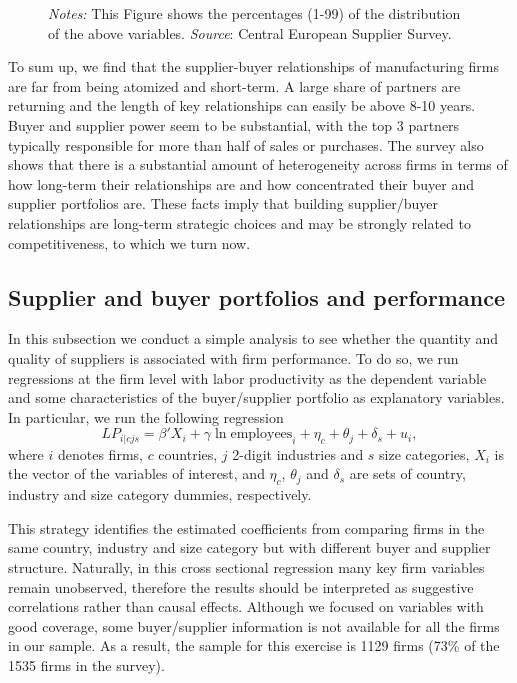 \documentclass[final, dvipsnames, authoryear,12pt]{elsarticle}
\begin{document}
\begin{figure}[!h]
\begin{center}
    \end{center}    
        {\footnotesize \textit{Notes:} This Figure shows the percentages (1-99) of the distribution of the above variables. \textit{Source}: Central European Supplier Survey.} 
\end{figure}
\restoregeometry

To sum up, we find that the supplier-buyer relationships of manufacturing firms are far from being atomized and short-term. A large share of partners are returning and the length of key relationships can easily be above 8-10 years. Buyer and supplier power seem to be substantial, with the top 3 partners typically responsible for more than half of sales or purchases. The survey also shows that there is a substantial amount of heterogeneity across firms in terms of how long-term their relationships are and how concentrated their buyer and supplier portfolios are. These facts imply that building supplier/buyer relationships are long-term strategic choices and may be strongly related to competitiveness, to which we turn now.


\subsection{Supplier and buyer portfolios and performance}

In this subsection we conduct a simple analysis to see whether the quantity and quality of suppliers is associated with firm performance. To do so, we run regressions at the firm level with labor productivity as the dependent variable and some characteristics of the buyer/supplier portfolio as explanatory variables. In particular, we run the following regression
%
\begin{equation}
    LP_{i|cjs}=\beta' X_{i}+\gamma \ln \text{employees}_i+\eta_c+\theta_j+\delta_s+u_i,
\end{equation}{}
%
where $i$ denotes firms, $c$ countries, $j$ 2-digit industries and $s$ size categories, $X_{i}$ is the vector of the variables of interest, and $\eta_c$, $\theta_j$ and $\delta_s$ are sets of country, industry and size category dummies, respectively. 

This strategy identifies the estimated coefficients from comparing firms in the same country, industry and size category but with different buyer and supplier structure. Naturally, in this cross sectional regression many key firm variables remain unobserved, therefore the results should be interpreted as suggestive correlations rather than causal effects. Although we focused on variables with good coverage, some buyer/supplier information is not available for all the firms in our sample. As a result, the sample for this exercise is 1129 firms (73\% of the 1535 firms in the survey). 
\end{document}
